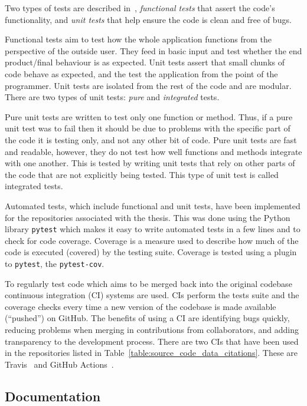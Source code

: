 Two types of tests are described in~\cite{Percival2014}, \textit{functional
tests} that assert the code's functionality, and \textit{unit tests} that help
ensure the code is clean and free of bugs.

Functional tests aim to test how the whole application functions from the
perspective of the outside user. They feed in basic input and test whether the
end product/final behaviour is as expected. Unit tests assert that small chunks
of code behave as expected, and the test the application from the point of the
programmer. Unit tests are isolated from the rest of the code and are modular.
There are two types of unit tests: \textit{pure} and \textit{integrated} tests.

Pure unit tests are written to test only one function or method. Thus, if a pure
unit test was to fail then it should be due to problems with the specific part
of the code it is testing only, and not any other bit of code. Pure unit tests
are fast and readable, however, they do not test how well functions and methods
integrate with one another. This is tested by writing unit tests
that rely on other parts of the code that are not explicitly being tested. This
type of unit test is called integrated tests.

Automated tests, which include functional and unit tests, have been implemented
for the repositories associated with the thesis. This was done using the Python
library \texttt{pytest} which makes it easy to write automated tests
in a few lines and to check for code coverage. Coverage is a measure used to
describe how much of the code is executed (covered) by the testing suite.
Coverage is tested using a plugin to \texttt{pytest}, the
\texttt{pytest-cov}.

To regularly test code which aims to be merged back into the original codebase
continuous integration (CI) systems are used. CIs perform the tests suite and
the coverage checks every time a new version of the codebase is made available
(``pushed'') on GitHub. The benefits of using a CI are identifying bugs quickly,
reducing problems when merging in contributions from collaborators, and adding
transparency to the development process. There are two CIs that have been used
in the repositories listed in Table~\ref{table:source_code_data_citations}.
These are Travis~\cite{travis} and GitHub Actions~\cite{github_actions}.

\subsection{Documentation}

